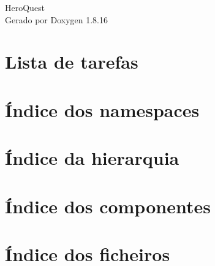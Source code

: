 \let\mypdfximage\pdfximage\def\pdfximage{\immediate\mypdfximage}\documentclass[twoside]{book}
\newcommand{\+}{\discretionary{\mbox{\scriptsize$\hookleftarrow$}}{}{}}
\newcommand{\clearemptydoublepage}{%
  \newpage{\pagestyle{empty}\cleardoublepage}%
}
\begin{document}
\hypersetup{pageanchor=false,
             bookmarksnumbered=true,
             pdfencoding=unicode
            }
\begin{titlepage}
\vspace*{7cm}
\begin{center}%
{\Large Hero\+Quest }\\
\vspace*{1cm}
{\large Gerado por Doxygen 1.8.16}\\
\end{center}
\end{titlepage}
\clearemptydoublepage
{}
\tableofcontents
\clearemptydoublepage
{}
\hypersetup{pageanchor=true}

\chapter{Lista de tarefas}
\label{todo}

\chapter{Índice dos namespaces}

\chapter{Índice da hierarquia}

\chapter{Índice dos componentes}

\chapter{Índice dos ficheiros}

\end{document}
